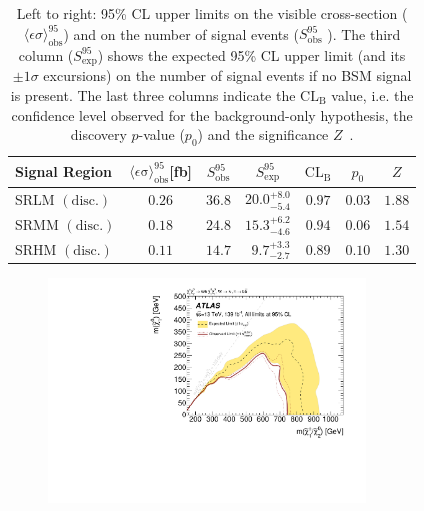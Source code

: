 \begin{table}
\begin{center}
\begin{tabular}{lcccccc}
\toprule
\textbf{Signal Region}                       & $\langle\epsilon{\mathrm{ \sigma}}\rangle_{\mathrm{ obs}}^{95}$[fb]  &  $S_{\mathrm{ obs}}^{95}$  & $S_{\mathrm{ exp}}^{95}$ & $\textrm{CL}_{\textrm{B}}$ & $p_{0}$ & $Z$  \\
\midrule
 SRLM $\mathrm{(disc.)}$    & $0.26$ &  $36.8$ & $ { 20.0 }^{ +8.0 }_{ -5.4 }$ & $0.97$ & $ 0.03$&$1.88$ \\%
 SRMM $\mathrm{(disc.)}$    & $0.18$ &  $24.8$ & $ { 15.3 }^{ +6.2 }_{ -4.6 }$ & $0.94$ & $ 0.06$&$1.54$ \\%
 SRHM $\mathrm{(disc.)}$    & $0.11$ &  $14.7$ & $ { ~~9.7 }^{ +3.3 }_{ -2.7 }$ & $0.89$ & $ 0.10$&$1.30$ \\%

\bottomrule
\end{tabular}
\caption[Breakdown of upper limits.]{
Left to right: 95\% CL upper limits on the visible cross-section
($\langle\epsilon\sigma\rangle_{\mathrm{ obs}}^{95}$) and on the number of
signal events ($S_{\mathrm{ obs}}^{95}$ ). 
The third column ($S_{\mathrm{ exp}}^{95}$) shows the expected 95\% CL upper limit (and its $\pm 1\sigma$ excursions) 
on the number of signal events if no BSM signal is present. 
The last three columns
indicate the $\textrm{CL}_{\textrm{B}}$ value, i.e. the confidence level observed for
the background-only hypothesis, the discovery $p$-value ($p_{0}$) and the significance $Z$~\cite{2008NIMPA.595..480C}.}
\label{upperlimit_toys}
\end{center}
\end{table}


 \begin{figure}
	\centering\includegraphics[width=0.75\textwidth]{contourPlotterWh1Lbb}
	\caption{}
	\label{fig:result_exclusion}
\end{figure}




